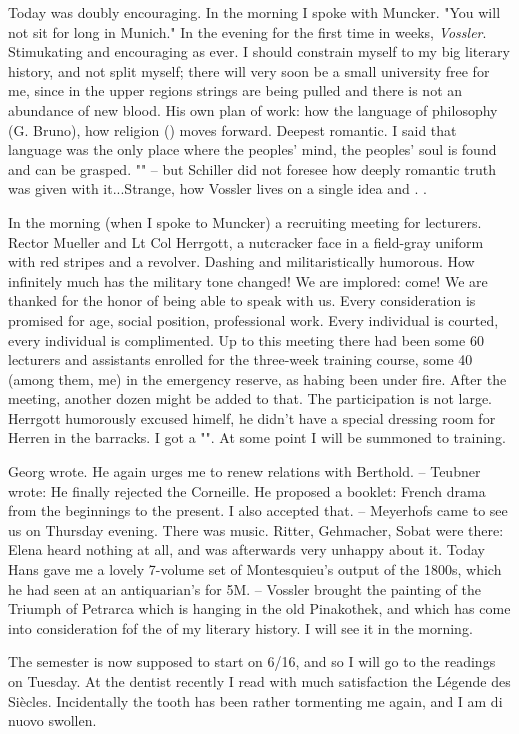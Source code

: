 
\missing

Today was doubly encouraging. In the morning I spoke with Muncker. "You will not sit for long in Munich." In the evening for the first time in weeks, \textit{Vossler}. Stimukating and encouraging as ever. I should constrain myself to my big literary history, and not split myself; there will very soon be a small university free for me, since in the upper regions strings are being pulled and there is not an abundance of new blood. His own plan of work: how the language of philosophy (G. Bruno), how religion () moves forward. Deepest romantic. I said that language was the only place where the peoples' mind, the peoples' soul is found and can be grasped. "" -- but Schiller did not foresee how deeply romantic truth was given with it...Strange, how Vossler lives on a single idea and . .

In the morning (when I spoke to Muncker) a recruiting meeting for lecturers. Rector Mueller and Lt Col Herrgott, a nutcracker face in a field-gray uniform with red stripes and a revolver. Dashing and militaristically humorous. How infinitely much has the military tone changed! We are implored: come! We are thanked for the honor of being able to speak with us. Every consideration is promised for age, social position, professional work. Every individual is courted, every individual is complimented. Up to this meeting there had been some 60 lecturers and assistants enrolled for the three-week training course, some 40 (among them, me) in the emergency reserve, as habing been under fire. After the meeting, another dozen might be added to that. The participation is not large. Herrgott humorously excused himelf, he didn't have a special dressing room for Herren in the barracks. I got a "". At some point I will be summoned to training.

Georg wrote. He again urges me to renew relations with Berthold. -- Teubner wrote: He finally rejected the Corneille. He proposed a booklet: French drama from the beginnings to the present. I also accepted that. -- Meyerhofs came to see us on Thursday evening. There was music. Ritter, Gehmacher, Sobat were there: Elena heard nothing at all, and was afterwards very unhappy about it. Today Hans gave me a lovely 7-volume set of Montesquieu's output of the 1800s, which he had seen at an antiquarian's for 5M. -- Vossler brought the painting of the Triumph of Petrarca which is hanging in the old Pinakothek, and which has come into consideration fof the  of my literary history. I will see it in the morning.

The semester is now supposed to start on 6/16, and so I will go to the readings on Tuesday. At the dentist recently I read with much satisfaction the Légende des Siècles. Incidentally the tooth has been rather tormenting me again, and I am di nuovo swollen.

